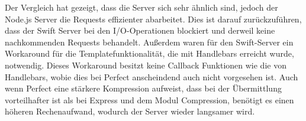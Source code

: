 Der Vergleich hat gezeigt, dass die Server sich sehr ähnlich sind, jedoch der Node.js Server die Requests effizienter abarbeitet. Dies ist darauf zurückzuführen, dass der Swift Server bei den I/O-Operationen blockiert und derweil keine nachkommenden Requests behandelt. Außerdem waren für den Swift-Server ein Workaround für die Templatefunktionalität, die mit Handlebars erreicht wurde, notwendig. Dieses Workaround besitzt keine Callback Funktionen wie die von Handlebars, wobie dies bei Perfect anscheindend auch nicht vorgesehen ist. Auch wenn Perfect eine stärkere Kompression aufweist, dass bei der Übermittlung vorteilhafter ist als bei Express und dem Modul Compression, benötigt es einen höheren Rechenaufwand, wodurch der Server wieder langsamer wird.

 \chapterend